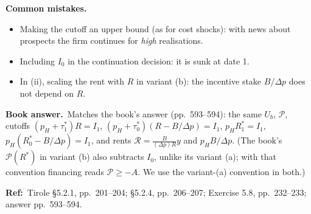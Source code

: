 \documentclass[11pt,a4paper]{article}
\newcommand{\bookans}{\par\medskip\noindent\textbf{Book answer.}~}
\newcommand{\refbib}{\par\smallskip\noindent\textbf{Ref:}~}
\newcommand{\pitfalls}{\par\medskip\noindent\textbf{Common mistakes.}}
\begin{document}
\pitfalls
\begin{itemize}
  \item Making the cutoff an upper bound (as for cost shocks): with news about prospects the firm continues for \emph{high} realisations.
  \item Including $I_0$ in the continuation decision: it is sunk at date 1.
  \item In (ii), scaling the rent with $R$ in variant (b): the incentive stake $B/\Delta p$ does not depend on $R$.
\end{itemize}

\bookans Matches the book's answer (pp.~593--594): the same $U_b$, $\mathcal P$, cutoffs $(p_H+\tau_1^*)R=I_1$, $(p_H+\tau_0^*)(R-B/\Delta p)=I_1$, $p_HR_1^*=I_1$, $p_H(R_0^*-B/\Delta p)=I_1$, and rents $\mathcal R=\frac{B}{(\Delta p)R}y$ and $p_HB/\Delta p$. (The book's $\mathcal P(R^*)$ in variant (b) also subtracts $I_0$, unlike its variant (a); with that convention financing reads $\mathcal P\ge-A$. We use the variant-(a) convention in both.)

\refbib Tirole \S 5.2.1, pp.~201--204; \S 5.2.4, pp.~206--207; Exercise 5.8, pp.~232--233; answer pp.~593--594.
\end{document}
